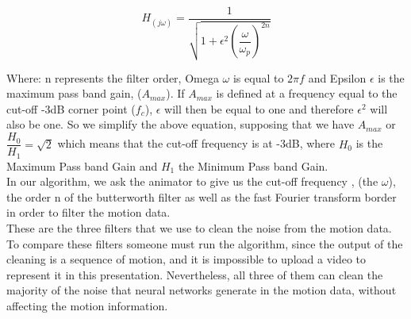 $$H_{(j\omega)} = \dfrac{1}{\sqrt{1 + \epsilon^2 (\dfrac{\omega}{\omega_p})^{2n}}}$$

Where: n represents the filter order, Omega $\omega$ is equal to $2\pi f$ and Epsilon $\epsilon$ is the maximum pass band gain, ($A_{max}$). If $A_{max}$ is defined at a frequency equal to the cut-off -3dB corner point ($f_c$), $\epsilon$ will then be equal to one and therefore $\epsilon^2$ will also be one. So we simplify the above equation, supposing that we have $A_{max}$ or $\dfrac{H_0}{H_1} = \sqrt{2}$ which means that the cut-off frequency is at -3dB, where $H_0$ is the Maximum Pass band Gain and $H_1$ the Minimum Pass band Gain.\\


In our algorithm, we ask the animator to give us the cut-off frequency , (the $\omega$), the order n of the butterworth filter as well as the fast Fourier transform  border in order to filter the motion data.\\

These are the three filters that we use to clean the noise from the motion data. To compare these filters someone must run the algorithm, since the output of the cleaning is a sequence of motion, and it is impossible to upload a video to represent it in this presentation. Nevertheless, all three of them can clean the majority of the noise that neural networks generate in the motion data, without affecting the motion information.